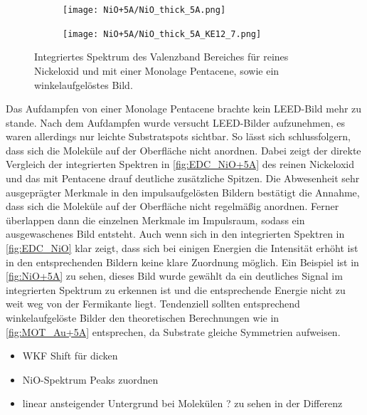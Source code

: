         \begin{figure}
            \centering
            \begin{subfigure}[t]{0.48\textwidth}
                \centering
                \texttt{[image: NiO+5A/NiO\_thick\_5A.png]}
                \label{fig:EDC_NiO+5A}
            \end{subfigure}
            \begin{subfigure}[t]{0.48\textwidth}
                \centering
                \texttt{[image: NiO+5A/NiO\_thick\_5A\_KE12\_7.png]}
                \label{fig:NiO+5A}
            \end{subfigure}
            \caption{Integriertes Spektrum des Valenzband Bereiches für reines Nickeloxid und mit einer Monolage Pentacene, sowie ein winkelaufgelöstes Bild.}
        \end{figure}
        Das Aufdampfen von einer Monolage Pentacene brachte kein LEED-Bild mehr zu stande.
        Nach dem Aufdampfen wurde versucht LEED-Bilder aufzunehmen, es waren allerdings nur leichte Substratspots sichtbar.
        So lässt sich schlussfolgern, dass sich die Moleküle auf der Oberfläche nicht anordnen.
        Dabei zeigt der direkte Vergleich der integrierten Spektren in \autoref{fig:EDC_NiO+5A} des reinen Nickeloxid und das mit Pentacene drauf deutliche zusätzliche Spitzen.
        Die Abwesenheit sehr ausgeprägter Merkmale in den impulsaufgelösten Bildern bestätigt die Annahme, dass sich die Moleküle auf der Oberfläche nicht regelmäßig anordnen.
        Ferner überlappen dann die einzelnen Merkmale im Impulsraum, sodass ein ausgewaschenes Bild entsteht.
        Auch wenn sich in den integrierten Spektren in \autoref{fig:EDC_NiO} klar zeigt, dass sich bei einigen Energien die Intensität erhöht ist in den entsprechenden Bildern keine klare Zuordnung möglich.
        Ein Beispiel ist in \autoref{fig:NiO+5A} zu sehen, dieses Bild wurde gewählt da ein deutliches Signal im integrierten Spektrum zu erkennen ist und die entsprechende Energie nicht zu weit weg von der Fermikante liegt.
        Tendenziell sollten entsprechend winkelaufgelöste Bilder den theoretischen Berechnungen wie in \autoref{fig:MOT_Au+5A} entsprechen, da Substrate gleiche Symmetrien aufweisen.
        \begin{itemize}
            \item WKF Shift für dicken
            \item NiO-Spektrum Peaks zuordnen
            \item linear ansteigender Untergrund bei Molekülen ? zu sehen in der Differenz
        \end{itemize}


